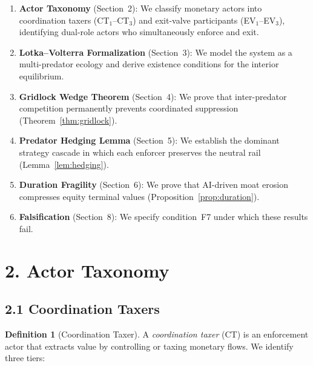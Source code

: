 \documentclass[12pt]{article}
\theoremstyle{definition}
\newtheorem{definition}{Definition}
\theoremstyle{remark}
\begin{document}
\begin{enumerate}[label=(\roman*)]
  \item \textbf{Actor Taxonomy} (Section~2): We classify monetary actors
    into coordination taxers (CT$_1$--CT$_3$) and exit-valve
    participants (EV$_1$--EV$_3$), identifying dual-role actors who
    simultaneously enforce and exit.
  \item \textbf{Lotka--Volterra Formalization} (Section~3): We model the
    system as a multi-predator ecology and derive existence conditions
    for the interior equilibrium.
  \item \textbf{Gridlock Wedge Theorem} (Section~4): We prove that
    inter-predator competition permanently prevents coordinated
    suppression (Theorem~\ref{thm:gridlock}).
  \item \textbf{Predator Hedging Lemma} (Section~5): We establish the
    dominant strategy cascade in which each enforcer preserves the
    neutral rail (Lemma~\ref{lem:hedging}).
  \item \textbf{Duration Fragility} (Section~6): We prove that
    AI-driven moat erosion compresses equity terminal values
    (Proposition~\ref{prop:duration}).
  \item \textbf{Falsification} (Section~8): We specify condition~F7
    under which these results fail.
\end{enumerate}

\section{2. Actor Taxonomy}\label{sec:taxonomy}

\subsection{2.1 Coordination Taxers}

\begin{definition}[Coordination Taxer]\label{def:ct}
A \emph{coordination taxer} (CT) is an enforcement actor that extracts
value by controlling or taxing monetary flows. We identify three tiers:
\end{definition}
\end{document}
